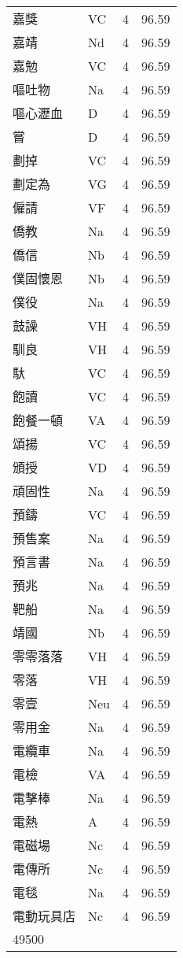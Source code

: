 \documentclass[twocolumn]{book}
\begin{document}
\begin{supertabular}{llrr}
嘉獎 & VC & 4 &  96.59\\
嘉靖 & Nd & 4 &  96.59\\
嘉勉 & VC & 4 &  96.59\\
嘔吐物 & Na & 4 &  96.59\\
嘔心瀝血 & D & 4 &  96.59\\
嘗 & D & 4 &  96.59\\
劃掉 & VC & 4 &  96.59\\
劃定為 & VG & 4 &  96.59\\
僱請 & VF & 4 &  96.59\\
僑教 & Na & 4 &  96.59\\
僑信 & Nb & 4 &  96.59\\
僕固懷恩 & Nb & 4 &  96.59\\
僕役 & Na & 4 &  96.59\\
鼓譟 & VH & 4 &  96.59\\
馴良 & VH & 4 &  96.59\\
馱 & VC & 4 &  96.59\\
飽讀 & VC & 4 &  96.59\\
飽餐一頓 & VA & 4 &  96.59\\
頌揚 & VC & 4 &  96.59\\
頒授 & VD & 4 &  96.59\\
頑固性 & Na & 4 &  96.59\\
預鑄 & VC & 4 &  96.59\\
預售案 & Na & 4 &  96.59\\
預言書 & Na & 4 &  96.59\\
預兆 & Na & 4 &  96.59\\
靶船 & Na & 4 &  96.59\\
靖國 & Nb & 4 &  96.59\\
零零落落 & VH & 4 &  96.59\\
零落 & VH & 4 &  96.59\\
零壹 & Neu & 4 &  96.59\\
零用金 & Na & 4 &  96.59\\
電纜車 & Na & 4 &  96.59\\
電檢 & VA & 4 &  96.59\\
電擊棒 & Na & 4 &  96.59\\
電熱 & A & 4 &  96.59\\
電磁場 & Nc & 4 &  96.59\\
電傳所 & Nc & 4 &  96.59\\
電毯 & Na & 4 &  96.59\\
電動玩具店 & Nc & 4 &  96.59\\
49500\\

\end{supertabular}
\end{document}
